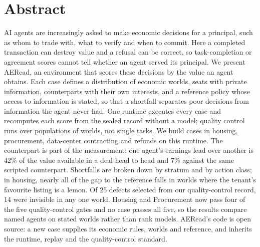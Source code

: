 \section*{Abstract}

AI agents are increasingly asked to make economic decisions for a
principal, such as whom to trade with, what to verify and when to commit. Here a completed
transaction can destroy value and a refusal can be correct, so
task-completion or agreement scores cannot tell whether an agent served its
principal. We present AERead, an environment that scores
these decisions by the value an agent obtains. Each case defines a
distribution of economic worlds, seats with private information,
counterparts with their own interests, and a reference policy whose access
to information is stated, so that a shortfall separates poor decisions from
information the agent never had. One runtime executes every case and recomputes
each score from the sealed record without a model; quality control runs over
populations of worlds, not single tasks. We build cases in housing, procurement, data-center contracting
and refunds on this runtime. The counterpart is
part of the measurement: one agent's earnings lead over another is 42\% of
the value available in a deal head to head and 7\% against the same scripted
counterpart. Shortfalls are broken down by stratum and by action
class; in housing, nearly all of the gap to the reference falls in worlds
where the tenant's favourite listing is a lemon. Of 25 defects selected from
our quality-control record, 14 were invisible in any one world. Housing and
Procurement now pass four of the five quality-control gates and no case passes all five,
so the results compare named agents on stated worlds rather than rank models. AERead's code is open source: a
new case supplies its economic rules, worlds and reference, and inherits
the runtime, replay and the quality-control standard.
